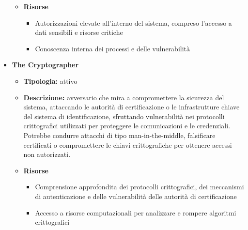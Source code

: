 \begin{itemize}
\begin{itemize}
                    \item \textbf{Risorse}
                        \begin{itemize}
                            \item Autorizzazioni elevate all'interno del sistema, compreso l'accesso a dati sensibili e risorse critiche
    
                            \vspace{3mm}
    
                            \item Conoscenza interna dei processi e delle vulnerabilità
                        \end{itemize}
                \end{itemize}
    
            \item \textbf{The Cryptographer}
                \begin{itemize}
                    \item \textbf{Tipologia:} attivo
                    
                    \item \textbf{Descrizione:} avversario che mira a compromettere la sicurezza del sistema, attaccando le autorità di certificazione o le infrastrutture chiave del sistema di identificazione, sfruttando vulnerabilità nei protocolli crittografici utilizzati per proteggere le comunicazioni e le credenziali.
                    Potrebbe condurre attacchi di tipo man-in-the-middle, falsificare certificati o compromettere le chiavi crittografiche per ottenere accessi non autorizzati.
                    
                    \item \textbf{Risorse}
                        \begin{itemize}
                            \item Comprensione approfondita dei protocolli crittografici, dei meccanismi di autenticazione e delle vulnerabilità delle autorità di certificazione
    
                            \vspace{3mm}
    
                            \item Accesso a risorse computazionali per analizzare e rompere algoritmi crittografici
                        \end{itemize}
                \end{itemize}
    

\end{itemize}
